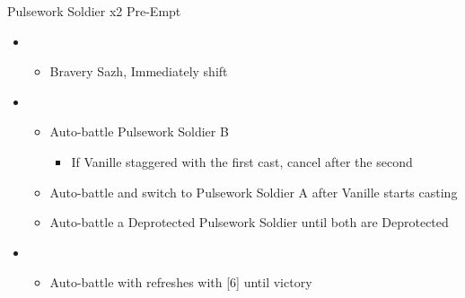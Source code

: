 \documentclass{report}
\begin{document}
\begin{battle}{Pulsework Soldier x2 Pre-Empt}
\begin{itemize}
    \item \second
    \begin{itemize}
        \item Bravery Sazh, Immediately shift
    \end{itemize}
    \item \third
    \begin{itemize}
        \item Auto-battle Pulsework Soldier B
        \begin{itemize}
            \item If Vanille staggered with the first cast, cancel after the second
        \end{itemize}
        \item Auto-battle and switch to Pulsework Soldier A after Vanille starts casting
        \item Auto-battle a Deprotected Pulsework Soldier until both are Deprotected
    \end{itemize}
    \item \first
    \begin{itemize}
        \item Auto-battle with refreshes with [6] until victory
    \end{itemize}
\end{itemize}
\end{battle}
\end{document}
